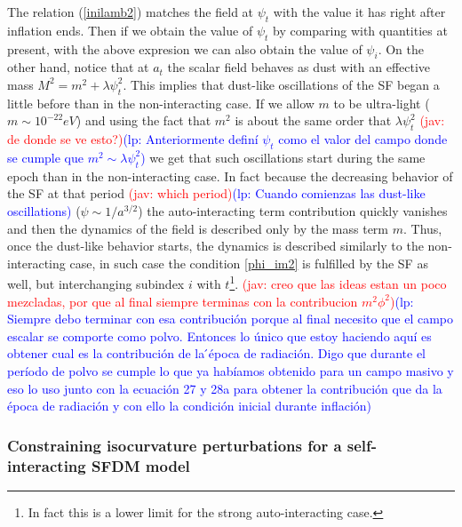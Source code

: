 \documentclass[amssymb,twocolumn,prd,nofootinbib,showpacs]{revtex4-1}
\newcommand{\jav}[1]{\textcolor{red}{(jav: #1)}}
\newcommand{\lp}[1]{\textcolor{blue}{(lp: #1)}}
\begin{document}
\begin{itemize}
The relation (\ref{inilamb2}) matches the field at $\psi_t$ with the value it has right after inflation ends. Then if we obtain the value of $\psi_t$ by comparing with quantities at present, with the above expresion we can also obtain the value of $\psi_i$. On the other hand, notice that at $a_t$ the scalar field behaves as dust with an effective mass $M^2=m^2+\lambda\psi^2_t$. This implies that dust-like oscillations of the SF began a little before than in the non-interacting case. If we allow $m$ to be ultra-light ($m\sim 10^{−22}eV$) and using the fact that $m^2$ is about the same order that $\lambda\psi^2_t$ \jav{de donde se ve esto?}\lp{Anteriormente defin\'i $\psi_t$ como el valor del campo donde se cumple que $m^2\sim \lambda\psi^2_t$} we get that such oscillations start during the same epoch 
than in the non-interacting case. 
%
In fact because the decreasing behavior of the SF at that period \jav{which period}\lp{Cuando comienzas las dust-like oscillations} ($\psi\sim 1/a^{3/2}$) the auto-interacting term contribution quickly vanishes and then the dynamics of the field is described  only by the mass term $m$. Thus, once the dust-like behavior starts, the dynamics 
is described similarly to  the non-interacting case, in such case the condition \eqref{phi_im2} is fulfilled by 
the SF as well, but interchanging subindex $i$ with $t$\footnote{In fact this is a lower limit for the 
strong auto-interacting case.}.
\jav{creo que las ideas estan un poco mezcladas, por que al final siempre terminas con la contribucion $m^2\phi^2$}\lp{Siempre debo terminar con esa contribuci\'on porque al final necesito  que  el  campo  escalar  se  comporte  como polvo.  Entonces lo  \'unico que estoy haciendo aqu\'i es  obtener  cual  es  la  contribuci\'on  de  la  ́\'epoca  de
radiaci\'on.   Digo  que  durante  el  per\'iodo  de  polvo se  cumple  lo  que  ya  hab\'iamos  obtenido  para  un campo masivo y eso lo uso junto con la ecuaci\'on 27 y 28a para obtener la contribuci\'on que da la  \'epoca de radiaci\'on y con ello la condici\'on inicial durante inflaci\'on}
\end{itemize}
\subsubsection{Constraining isocurvature perturbations for a self-interacting SFDM model}
\end{document}
